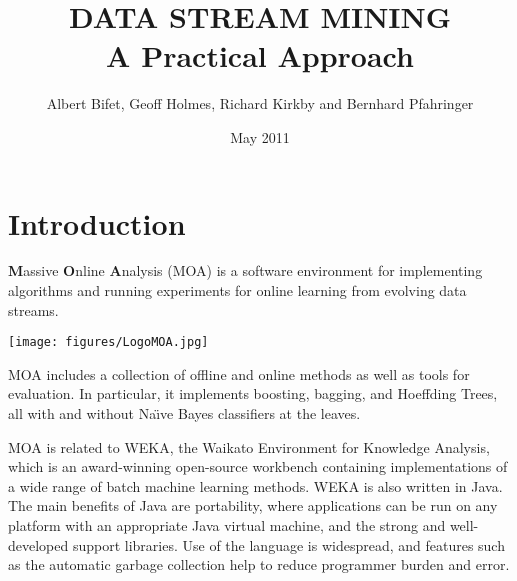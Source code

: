 \documentclass[a4paper,12pt,twoside]{book}
\title{
\textbf{DATA STREAM MINING\\ A Practical Approach} %
 }
\author{Albert Bifet, Geoff Holmes, Richard Kirkby and Bernhard Pfahringer}
\date{May 2011}%
\begin{document}
\lstset{language=Java,basicstyle=\tiny,numbers=left}



\maketitle
{}
\thispagestyle{empty}
\cleardoublepage
\thispagestyle{empty}
\tableofcontents
\cleardoublepage
{}

\def\adwin{{\tt ADWIN }}
\def\thesis{text }
\def\thesisc{text}


\chapter*{Introduction}
\thispagestyle{empty}

{\bf M}assive {\bf O}nline {\bf A}nalysis (MOA) is a %
software environment for implementing algorithms and running experiments
for online learning from %
evolving data streams.

\begin{center}
\texttt{[image: figures/LogoMOA.jpg]} \end{center}

MOA includes a collection of offline and online methods as well as tools for evaluation. 
In particular, it implements boosting, bagging, and Hoeffding Trees, all %
with and without Na{\"\i}ve Bayes classifiers at the leaves. 


MOA is related to WEKA, the Waikato
Environment for Knowledge Analysis, which is an award-winning open-source 
workbench containing implementations of a wide range of batch machine 
learning methods. WEKA is also written in Java. The main benefits
of Java are portability, where applications can be run on any platform with
an appropriate Java virtual machine, and the strong and well-developed support 
libraries. Use of the language is widespread, and features such as the
automatic garbage collection help to reduce programmer burden and error.
\end{document}
